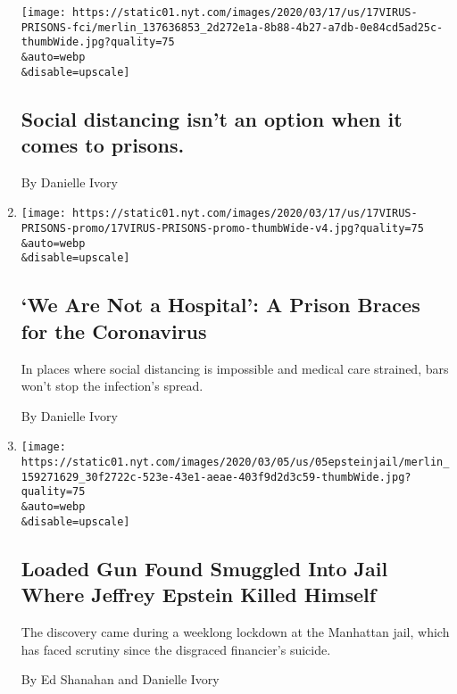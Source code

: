 \begin{enumerate}
  \texttt{[image: https://static01.nyt.com/images/2020/03/17/us/17VIRUS-PRISONS-fci/merlin\_137636853\_2d272e1a-8b88-4b27-a7db-0e84cd5ad25c-thumbWide.jpg?quality=75\\\&auto=webp\\\&disable=upscale]}

  \hypertarget{social-distancing-isnt-an-option-when-it-comes-to-prisons}{%
  \subsection{Social distancing isn't an option when it comes to
  prisons.}\label{social-distancing-isnt-an-option-when-it-comes-to-prisons}}

  By Danielle Ivory
\item
  \href{/2020/03/17/us/coronavirus-prisons-jails.html}{}

  \texttt{[image: https://static01.nyt.com/images/2020/03/17/us/17VIRUS-PRISONS-promo/17VIRUS-PRISONS-promo-thumbWide-v4.jpg?quality=75\\\&auto=webp\\\&disable=upscale]}

  \hypertarget{we-are-not-a-hospital-a-prison-braces-for-the-coronavirus}{%
  \subsection{`We Are Not a Hospital': A Prison Braces for the
  Coronavirus}\label{we-are-not-a-hospital-a-prison-braces-for-the-coronavirus}}

  In places where social distancing is impossible and medical care
  strained, bars won't stop the infection's spread.

  By Danielle Ivory
\item
  \href{/2020/03/06/nyregion/jeffrey-epstein-gun-jail.html}{}

  \texttt{[image: https://static01.nyt.com/images/2020/03/05/us/05epsteinjail/merlin\_159271629\_30f2722c-523e-43e1-aeae-403f9d2d3c59-thumbWide.jpg?quality=75\\\&auto=webp\\\&disable=upscale]}

  \hypertarget{loaded-gun-found-smuggled-into-jail-where-jeffrey-epstein-killed-himself}{%
  \subsection{Loaded Gun Found Smuggled Into Jail Where Jeffrey Epstein
  Killed
  Himself}\label{loaded-gun-found-smuggled-into-jail-where-jeffrey-epstein-killed-himself}}

  The discovery came during a weeklong lockdown at the Manhattan jail,
  which has faced scrutiny since the disgraced financier's suicide.

  By Ed Shanahan and Danielle Ivory
\end{enumerate}


